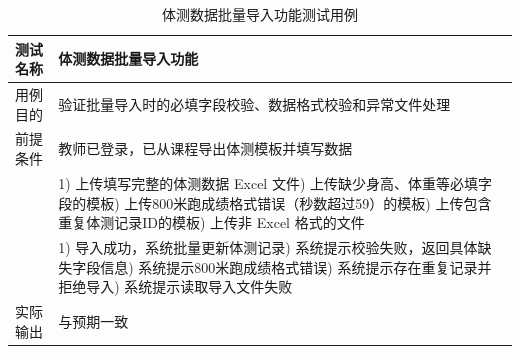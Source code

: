 \begin{table}[H]
  \centering
  \caption{体测数据批量导入功能测试用例}
  \label{tab:tc-fitness-import}
  \footnotesize
  \renewcommand{\arraystretch}{1.35}
  \begin{tabularx}{\textwidth}{|L{2.4cm}|X|}
    \hline
    测试名称 & 体测数据批量导入功能 \\
    \hline
    用例目的 & 验证批量导入时的必填字段校验、数据格式校验和异常文件处理 \\
    \hline
    前提条件 & 教师已登录，已从课程导出体测模板并填写数据 \\
    \hline
     &
      1) 上传填写完整的体测数据 Excel 文件) 上传缺少身高、体重等必填字段的模板) 上传800米跑成绩格式错误（秒数超过59）的模板) 上传包含重复体测记录ID的模板) 上传非 Excel 格式的文件 \\
    \hline
     &
      1) 导入成功，系统批量更新体测记录) 系统提示校验失败，返回具体缺失字段信息) 系统提示800米跑成绩格式错误) 系统提示存在重复记录并拒绝导入) 系统提示读取导入文件失败 \\
    \hline
    实际输出 & 与预期一致 \\
    \hline
  \end{tabularx}
\end{table}


